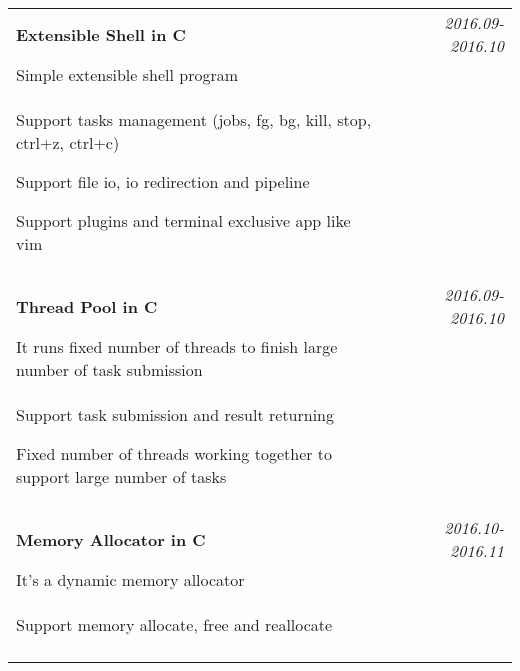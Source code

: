 \documentclass[a4paper,10pt]{article}
\begin{document}
\begin{tabular}{p{13.5cm}p{0.5cm}r}
\textbf{Extensible Shell in C} && \emph{2016.09-2016.10} \\
\hspace{1em} Simple extensible shell program && \vspace{-0.5em} \\
\begin{compactitem}
  \item Support tasks management (jobs, fg, bg, kill, stop, ctrl+z, ctrl+c) \vspace{0.2em}
  \item Support file io, io redirection and pipeline \vspace{0.2em}
  \item Support plugins and terminal exclusive app like vim \vspace{0.2em}  
\end{compactitem}&&\vspace{-2.2em} \\
\multicolumn{3}{c}{} \\


\textbf{Thread Pool in C} && \emph{2016.09-2016.10} \\
\hspace{1em} It runs fixed number of threads to finish large number of task submission && \vspace{-0.5em} \\
\begin{compactitem}
  \item Support task submission and result returning\vspace{0.2em}
  \item Fixed number of threads working together to support large number of tasks
\end{compactitem}&&\vspace{-2.2em} \\
\multicolumn{3}{c}{} \\

\textbf{Memory Allocator in C} && \emph{2016.10-2016.11} \\
\hspace{1em} It's a dynamic memory allocator && \vspace{-0.5em} \\
\begin{compactitem}
  \item Support memory allocate, free and reallocate \vspace{0.2em}
\end{compactitem}&&\vspace{-2.2em} \\
\multicolumn{3}{c}{} \\


\end{tabular}
\end{document}
